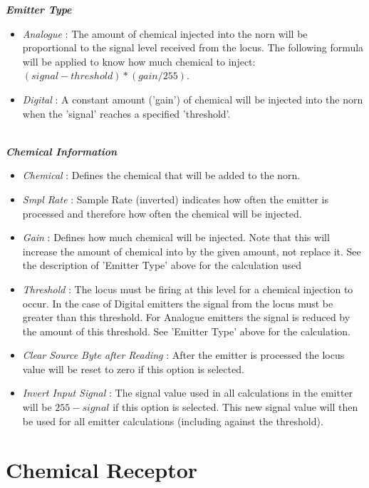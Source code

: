 \documentclass[11pt,twoside,a4paper]{article}
\begin{document}
\textbf{\textit{Emitter Type}}
\begin{itemize}
	\item[] \emph{Analogue} : The amount of chemical injected into the norn will be proportional to the signal level received from the locus. The following formula will be applied to know how much chemical to inject: $(signal - threshold) * (gain / 255)$.
	\item[] \emph{Digital} : A constant amount ('gain') of chemical will be injected into the norn when the 'signal' reaches a specified 'threshold'. 
\end{itemize}~\\

\textbf{\textit{Chemical Information}}
\begin{itemize}
	\item[] \emph{Chemical} : Defines the chemical that will be added to the norn.
	\item[] \emph{Smpl Rate} : Sample Rate (inverted) indicates how often the emitter is processed and therefore how often the chemical will be injected. %
	\item[] \emph{Gain} : Defines how much chemical will be injected. Note that this will increase the amount of chemical into by the given amount, not replace it. See the description of 'Emitter Type' above for the calculation used~\\
	\item[] \emph{Threshold} : The locus must be firing at this level for a chemical injection to occur. In the case of Digital emitters the signal from the locus must be greater than this threshold. For Analogue emitters the signal is reduced by the amount of this threshold. See 'Emitter Type' above for the calculation. 
	\item[] \emph{Clear Source Byte after Reading} : After the emitter is processed the locus value will be reset to zero if this option is selected.
	\item[] \textit{Invert Input Signal} : The signal value used in all calculations in the emitter will be $255-signal$ if this option is selected. This new signal value will then be used for all emitter calculations (including against the threshold).
\end{itemize}


\section{Chemical Receptor} %
\end{document}
